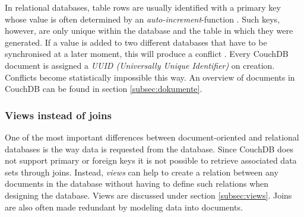 In relational databases, table rows are usually identified with a primary key whose value is often determined by an \textit{auto-increment}-function \cite{couchdb:ibm}. Such keys, however, are only unique within the database and the table in which they were generated. If a value is added to two different databases that have to be synchronised at a later moment, this will produce a conflict \cite{mysql:increment}. Every CouchDB document is assigned a \textit{UUID (Universally Unique Identifier)} on creation. Conflicts become statistically impossible this way. An overview of documents in CouchDB can be found in section \ref{subsec:dokumente}.

\subsubsection{Views instead of joins}

One of the most important differences between document-oriented and relational databases is the way data is requested from the database. Since CouchDB does not support primary or foreign keys it is not possible to retrieve associated data sets through joins. Instead, \textit{views} can help to create a relation between any documents in the database without having to define such relations when designing the database. Views are discussed under section \ref{subsec:views}. Joins are also often made redundant by modeling data into documents.